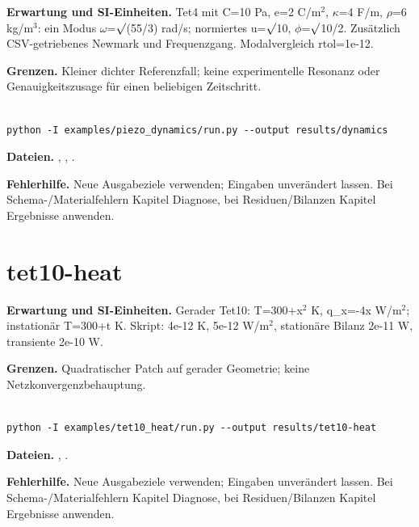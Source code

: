 \textbf{Erwartung und SI-Einheiten.} Tet4 mit C=10 Pa, e=2 C/m$^2$, $\kappa$=4 F/m, $\rho$=6 kg/m$^3$: ein Modus $\omega$=$\surd$(55/3) rad/s; normiertes u=$\surd$10, $\phi$=$\surd$10/2. Zusätzlich CSV-getriebenes Newmark und Frequenzgang. Modalvergleich rtol=1e-12.

\textbf{Grenzen.} Kleiner dichter Referenzfall; keine experimentelle Resonanz oder Genauigkeitszusage für einen beliebigen Zeitschritt.

\begin{lstlisting}

python -I examples/piezo_dynamics/run.py --output results/dynamics

\end{lstlisting}

\textbf{Dateien.} , , .

\textbf{Fehlerhilfe.} Neue Ausgabeziele verwenden; Eingaben unverändert lassen. Bei Schema-/Materialfehlern Kapitel Diagnose, bei Residuen/Bilanzen Kapitel Ergebnisse anwenden.



\section{tet10-heat}\label{recipe:tet10-heat}

\textbf{Erwartung und SI-Einheiten.} Gerader Tet10: T=300+x$^2$ K, q\_x=-4x W/m$^2$; instationär T=300+t K. Skript: 4e-12 K, 5e-12 W/m$^2$, stationäre Bilanz 2e-11 W, transiente 2e-10 W.

\textbf{Grenzen.} Quadratischer Patch auf gerader Geometrie; keine Netzkonvergenzbehauptung.

\begin{lstlisting}

python -I examples/tet10_heat/run.py --output results/tet10-heat

\end{lstlisting}

\textbf{Dateien.} , .

\textbf{Fehlerhilfe.} Neue Ausgabeziele verwenden; Eingaben unverändert lassen. Bei Schema-/Materialfehlern Kapitel Diagnose, bei Residuen/Bilanzen Kapitel Ergebnisse anwenden.



